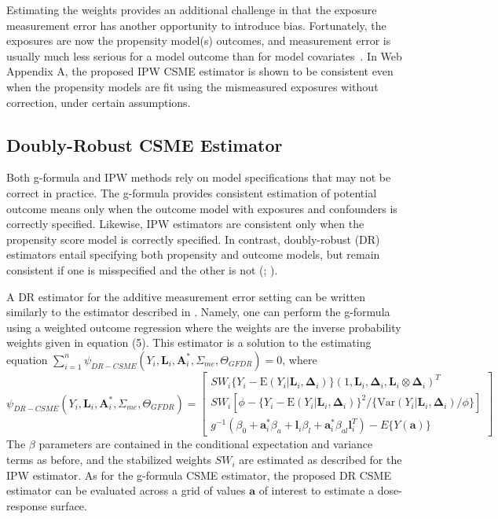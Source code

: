 \documentclass[useAMS,usenatbib,referee]{biom}
\begin{document}
Estimating the weights provides an additional challenge in that the exposure measurement error has another opportunity to introduce bias. Fortunately, the exposures are now the propensity model(s) outcomes, and measurement error is usually much less serious for a model outcome than for model covariates~\citep{carroll2006}. In Web Appendix A, the proposed IPW CSME estimator is shown to be consistent even when the propensity models are fit using the mismeasured exposures without correction, under certain assumptions.

\subsection{Doubly-Robust CSME Estimator}

Both g-formula and IPW methods rely on model specifications that may not be correct in practice. The g-formula provides consistent estimation of potential outcome means only when the outcome model with exposures and confounders is correctly specified. Likewise, IPW estimators are consistent only when the propensity score model is correctly specified. In contrast, doubly-robust (DR) estimators entail specifying both propensity and outcome models, but remain consistent if one is misspecified and the other is not (\citealp*{robins1994}; \citealp{lunceford2004,bang2005}).

A DR estimator for the additive measurement error setting can be written similarly to the estimator described in \citet{hirano2001}. Namely, one can perform the g-formula using a weighted outcome regression where the weights are the inverse probability weights given in equation (5). This estimator is a solution to the estimating equation $\sum_{i=1}^{n} \psi_{DR-CSME}(Y_{i}, \bm{L}_{i}, \bm{A}_{i}^{*}, \Sigma_{me}, \Theta_{GFDR}) = 0$, where
\begin{equation}
    \psi_{DR-CSME}(Y_{i}, \bm{L}_{i}, \bm{A}^{*}_{i}, \Sigma_{me}, \Theta_{GFDR}) =
    \begin{bmatrix}
       SW_{i}\{ Y_{i} - \text{E}(Y_{i} | \bm{L}_{i}, \bm{\Delta}_{i}) \} (1, \bm{L}_{i}, \bm{\Delta}_{i}, \bm{L}_{i} \otimes \bm{\Delta}_{i})^{T} \\
        SW_{i}[\phi - \{ Y_{i} - \text{E}(Y_{i} | \bm{L}_{i}, \bm{\Delta}_{i}) \}^{2} / \{ \text{Var}(Y_{i} | \bm{L}_{i}, \bm{\Delta}_{i}) / \phi \}] \\
        g^{-1}(\beta_{0} + \bm{a}^{*}_{i}\beta_{a} + \bm{l}_{i}\beta_{l} +
        \bm{a}^{*}_{i}\beta_{al}\bm{l}_{i}^{T}) - E \{ Y(\bm{a}) \}
    \end{bmatrix}
\end{equation}
The $\beta$ parameters are contained in the conditional expectation and variance terms as before, and the stabilized weights $SW_{i}$ are estimated as described for the IPW estimator. As for the g-formula CSME estimator, the proposed DR CSME estimator can be evaluated across a grid of values $\bm{a}$ of interest to estimate a dose-response surface.
\end{document}
